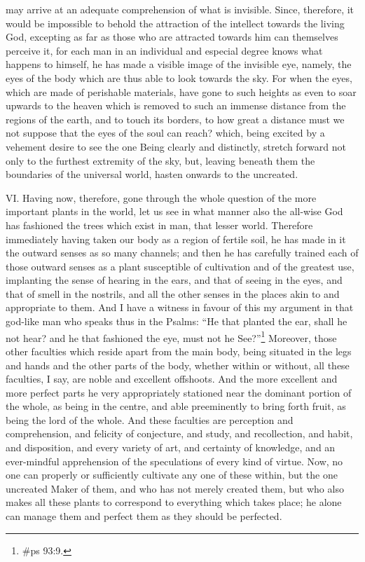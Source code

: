 may arrive at an adequate comprehension of what is invisible. Since, therefore, it would be
impossible to behold the attraction of the intellect towards the living God, excepting as far as those
who are attracted towards him can themselves perceive it, for each man in an individual and
especial degree knows what happens to himself, he has made a visible image of the invisible eye,
namely, the eyes of the body which are thus able to look towards the sky. For when the eyes, which
are made of perishable materials, have gone to such heights as even to soar upwards to the
heaven which is removed to such an immense distance from the regions of the earth, and to touch
its borders, to how great a distance must we not suppose that the eyes of the soul can reach?
which, being excited by a vehement desire to see the one Being clearly and distinctly, stretch
forward not only to the furthest extremity of the sky, but, leaving beneath them the boundaries of
the universal world, hasten onwards to the uncreated.

VI. Having now, therefore, gone through the whole question of the more important plants in the
world, let us see in what manner also the all-wise God has fashioned the trees which exist in man,
that lesser world. Therefore immediately having taken our body as a region of fertile soil, he has
made in it the outward senses as so many channels; and then he has carefully trained each of
those outward senses as a plant susceptible of cultivation and of the greatest use, implanting the
sense of hearing in the ears, and that of seeing in the eyes, and that of smell in the nostrils, and all
the other senses in the places akin to and appropriate to them. And I have a witness in favour of
this my argument in that god-like man who speaks thus in the Psalms: ``He that planted the ear,
shall he not hear? and he that fashioned the eye, must not he See?''\footnote{\#ps 93:9.} Moreover, those
other faculties which reside apart from the main body, being situated in the legs and hands and the
other parts of the body, whether within or without, all these faculties, I say, are noble and excellent
offshoots. And the more excellent and more perfect parts he very appropriately stationed near the
dominant portion of the whole, as being in the centre, and able preeminently to bring forth fruit, as
being the lord of the whole. And these faculties are perception and comprehension, and felicity of
conjecture, and study, and recollection, and habit, and disposition, and every variety of art, and
certainty of knowledge, and an ever-mindful apprehension of the speculations of every kind of
virtue. Now, no one can properly or sufficiently cultivate any one of these within, but the one
uncreated Maker of them, and who has not merely created them, but who also makes all these
plants to correspond to everything which takes place; he alone can manage them and perfect them
as they should be perfected.

